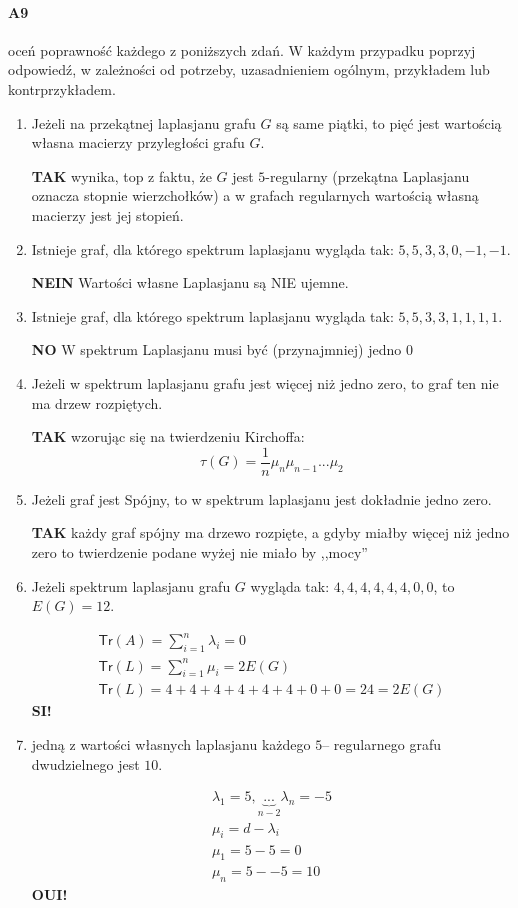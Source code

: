 \documentclass[a4paper,12pt]{article}
\theoremstyle{definition}%
\theoremstyle{definition}
\theoremstyle{problem}
\begin{document}
\paragraph{A9} oceń poprawność każdego z poniższych zdań. W każdym przypadku poprzyj odpowiedź, w zależności od potrzeby, uzasadnieniem ogólnym, przykładem lub kontrprzykładem.
\begin{enumerate}[label=\alph*)]
\item Jeżeli na przekątnej laplasjanu grafu $G$ są same piątki, to pięć jest wartością własna macierzy przyległości grafu $G$.

\textbf{TAK} wynika, top z faktu, że $G$ jest $5$-regularny (przekątna Laplasjanu oznacza stopnie wierzchołków) a w grafach regularnych wartością własną macierzy jest jej stopień. 
\item Istnieje graf, dla którego spektrum laplasjanu wygląda tak: $5,5,3,3,0,-1,-1$.

\textbf{NEIN} Wartości własne Laplasjanu są NIE ujemne.
\item Istnieje graf, dla którego spektrum laplasjanu wygląda tak: $5,5,3,3,1,1,1,1$.

\textbf{NO} W spektrum Laplasjanu musi być (przynajmniej) jedno $0$
\item Jeżeli w spektrum laplasjanu grafu jest więcej niż jedno zero, to graf ten nie ma drzew rozpiętych.

\textbf{TAK} wzorując się na twierdzeniu Kirchoffa: $$\tau (G)=\frac{1}{n}\mu _n\mu_{n-1}...\mu _2$$
\item Jeżeli graf jest Spójny, to w spektrum laplasjanu jest dokładnie jedno zero.

\textbf{TAK} każdy graf spójny ma drzewo rozpięte, a gdyby miałby więcej niż jedno zero to twierdzenie podane wyżej nie miało by ,,mocy''
\item Jeżeli spektrum laplasjanu grafu $G$ wygląda tak: $4,4,4,4,4,4,0,0$, to $E(G) = 12$.

\begin{align*}
\mathsf{Tr}(A)=\sum _{i=1}^n \lambda _i = 0\\
\mathsf{Tr}(L)=\sum _{i=1}^n \mu _i = 2E(G)\\
\mathsf{Tr}(L)=4+4+4+4+4+4+0+0=24 = 2E(G)
\end{align*}
\textbf{SI!}
\item jedną z wartości własnych laplasjanu każdego $5$– regularnego grafu dwudzielnego jest $10$.

\begin{align*}
\lambda _1 = 5, \underbrace{...}_{n-2} \lambda _n = -5\\
\mu _i = d-\lambda _i\\
\mu _1 = 5-5 = 0\\
\mu _n = 5--5=10
\end{align*}
\textbf{OUI!}
\end{enumerate}
\end{document}
